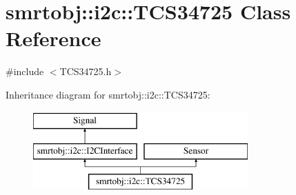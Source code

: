 \hypertarget{classsmrtobj_1_1i2c_1_1_t_c_s34725}{}\section{smrtobj\+:\+:i2c\+:\+:T\+C\+S34725 Class Reference}
\label{classsmrtobj_1_1i2c_1_1_t_c_s34725}


{\ttfamily \#include $<$T\+C\+S34725.\+h$>$}

Inheritance diagram for smrtobj\+:\+:i2c\+:\+:T\+C\+S34725\+:\begin{figure}[H]
\begin{center}
\leavevmode
\includegraphics[height=3.000000cm]{classsmrtobj_1_1i2c_1_1_t_c_s34725}
\end{center}
\end{figure}
